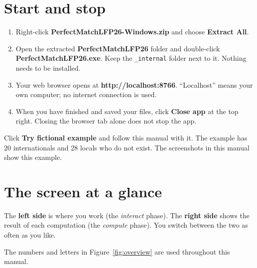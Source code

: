 \documentclass[11pt,a4paper]{article}
\newcommand{\ui}[1]{\textbf{#1}}
\begin{document}
\section{Start and stop}
\begin{enumerate}[leftmargin=*]
  \item Right-click \textbf{PerfectMatchLFP26-Windows.zip} and choose \ui{Extract All}.
  \item Open the extracted \textbf{PerfectMatchLFP26} folder and double-click \textbf{PerfectMatchLFP26.exe}.
        Keep the \texttt{\_internal} folder next to it. Nothing needs to be installed.
  \item Your web browser opens at \textbf{http://localhost:8766}. ``Localhost'' means your own computer;
        no internet connection is used.
  \item When you have finished and saved your files, click \ui{Close app} at the top right.
        Closing the browser tab alone does not stop the app.
\end{enumerate}
\begin{tip}
Click \ui{Try fictional example} and follow this manual with it. The example has 20 internationals and
28 locals who do not exist. The screenshots in this manual show this example.
\end{tip}

\section{The screen at a glance}
The \textbf{left side} is where you work (the \emph{interact} phase). The \textbf{right side} shows the result of
each computation (the \emph{compute} phase). You switch between the two as often as you like.

The numbers and letters in Figure~\ref{fig:overview} are used throughout this manual.
\end{document}
